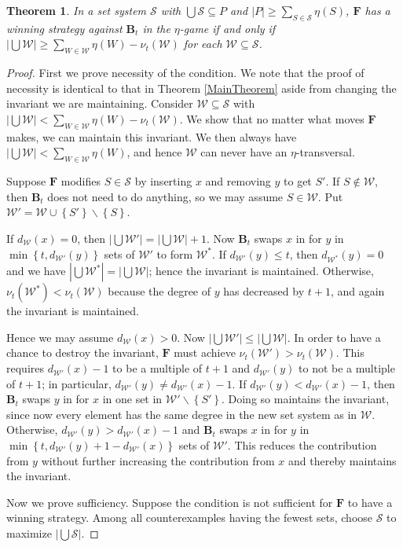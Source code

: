 \documentclass[12pt]{amsart}
\theoremstyle{plain}
\newtheorem{thm}{Theorem}[section]
\theoremstyle{definition}
\theoremstyle{remark}
\newcommand{\fancy}[1]{\mathcal{#1}}
\newcommand{\set}[1]{\left\{ #1 \right\}}
\newcommand{\card}[1]{\left|#1\right|}
\renewcommand{\S}{\fancy{S}}
\newcommand{\W}{\fancy{W}}
\newcommand{\F}{\mathbf{F}}
\newcommand{\B}{\mathbf{B}}
\newcommand{\myhat}[1]{#1^*}
\begin{document}
\begin{thm}\label{MainTheoremMulti}
In a set system $\S$ with $\bigcup \S \subseteq P$ and $\card{P} \geq \sum_{S \in \S}
\eta(S)$, $\F$ has a winning strategy against $\B_t$ in the $\eta$-game if and only if $\card{\bigcup
\W} \geq \sum_{W \in \W}
\eta(W) - \nu_t(\W)$ for each $\W \subseteq \S$.
\end{thm}
\begin{proof}
First we prove necessity of the condition. We note that the proof of necessity is identical to that in Theorem \ref{MainTheorem} aside from changing the invariant we are maintaining.  
Consider $\W \subseteq \S$ with $\card{\bigcup\W} < \sum_{W \in \W} \eta(W) - \nu_t(\W)$.  We show that no matter what moves
$\F$ makes, we can maintain this invariant.  We then always have $\card{\bigcup\W} < \sum_{W \in \W} \eta(W)$, and hence $\W$ can never have an
$\eta$-transversal. 

Suppose $\F$ modifies $S \in \S$ by inserting $x$ and removing $y$
to get $S'$.  If $S \not \in \W$, then $\B_t$ does not need to do anything, so we may assume $S \in
\W$. Put $\W' = \W \cup \set{S'} \smallsetminus \set{S}$.

If $d_{\W}(x) = 0$, then $\card{\bigcup \W'} = \card{\bigcup \W} + 1$. 
Now $\B_t$ swaps $x$ in for $y$ in $\min\set{t, d_{\W'}(y)}$ sets of $\W'$ to form $\myhat{\W}$.  
If $d_{\W'}(y) \leq t$, then $d_{\myhat{\W}}(y) = 0$ and we have $\card{\bigcup \myhat{\W}}
= \card{\bigcup \W}$; hence the invariant is maintained.  Otherwise, $\nu_t(\myhat{\W}) <
\nu_t(\W)$ because the degree of $y$ has decreased by $t+1$, and again the invariant is maintained.

Hence we may assume $d_{\W}(x) > 0$.  Now $\card{\bigcup \W'} \leq \card{\bigcup \W}$.  In order to have a chance to destroy the invariant, $\F$ must achieve $\nu_t(\W') > \nu_t(\W)$.  This requires $d_{\W'}(x) - 1$ to be a multiple of $t+1$ and $d_{\W'}(y)$ to not be a multiple of $t+1$; in particular, $d_{\W'}(y) \neq d_{\W'}(x) - 1$.  If $d_{\W'}(y) < d_{\W'}(x) - 1$, then $\B_t$ swaps $y$ in for $x$ in one set in $\W' \smallsetminus \set{S'}$.  Doing so maintains the invariant, since now every element has the same degree in the new set system as in $\W$.  Otherwise, $d_{\W'}(y) > d_{\W'}(x) - 1$ and $\B_t$ swaps $x$ in for $y$ in $\min\set{t, d_{\W'}(y) + 1 - d_{\W'}(x)}$ sets of $\W'$. This reduces the contribution from $y$ without further increasing the contribution from $x$ and thereby maintains the invariant.

Now we prove sufficiency.  Suppose the condition is not sufficient for $\F$ to
have a winning strategy.  Among all counterexamples having the fewest sets, choose $\S$ to maximize $\card{\bigcup \S}$.


\end{proof}
\end{document}
